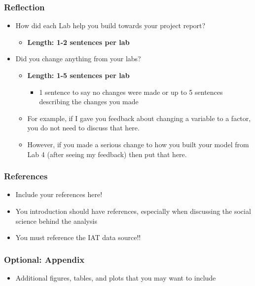 \documentclass[
  letterpaper,
  DIV=11,
  numbers=noendperiod]{scrartcl}
\providecommand{\tightlist}{%
  \setlength{\itemsep}{0pt}\setlength{\parskip}{0pt}}\usepackage{longtable,booktabs,array}
\begin{document}
\hypertarget{reflection}{%
\subsubsection{Reflection}\label{reflection}}

\begin{itemize}
\tightlist
\item
  How did each Lab help you build towards your project report?

  \begin{itemize}
  \tightlist
  \item
    \textbf{Length: 1-2 sentences per lab}
  \end{itemize}
\item
  Did you change anything from your labs?

  \begin{itemize}
  \tightlist
  \item
    \textbf{Length: 1-5 sentences per lab}

    \begin{itemize}
    \tightlist
    \item
      1 sentence to say no changes were made or up to 5 sentences
      describing the changes you made
    \end{itemize}
  \item
    For example, if I gave you feedback about changing a variable to a
    factor, you do not need to discuss that here.
  \item
    However, if you made a serious change to how you built your model
    from Lab 4 (after seeing my feedback) then put that here.
  \end{itemize}
\end{itemize}

\hypertarget{references}{%
\subsubsection{References}\label{references}}

\begin{itemize}
\tightlist
\item
  Include your references here!
\item
  You introduction should have references, especially when discussing
  the social science behind the analysis
\item
  You must reference the IAT data source!!
\end{itemize}

\hypertarget{optional-appendix}{%
\subsubsection{Optional: Appendix}\label{optional-appendix}}

\begin{itemize}
\tightlist
\item
  Additional figures, tables, and plots that you may want to include
\end{itemize}
\end{document}
